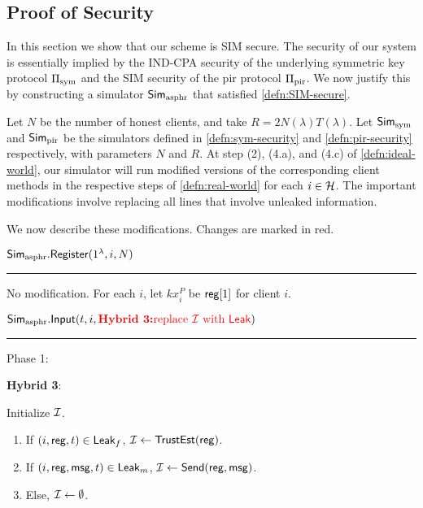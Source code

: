 \subsection{Proof of Security}
In this section we show that our scheme is SIM secure. The security of our system is essentially implied by the IND-CPA security of the underlying symmetric key protocol $\Pi_{\text{sym}}$ and the SIM security of the pir protocol $\Pi_{\text{pir}}$. We now justify this by constructing a simulator $\mathsf{Sim}_{\text{asphr}}$ that satisfied \cref{defn:SIM-secure}.

Let $N$ be the number of honest clients, and take $R = 2N(\lambda)T(\lambda)$. Let $\mathsf{Sim}_{\text{sym}}$ and $\mathsf{Sim}_{\text{pir}}$ be the simulators defined in \cref{defn:sym-security} and \cref{defn:pir-security} respectively, with parameters $N$ and $R$. At step (2), (4.a), and (4.c) of \cref{defn:ideal-world}, our simulator will run modified versions of the corresponding client methods in the respective steps of \cref{defn:real-world} for each $i \in \mathcal{H}$. The important modifications involve replacing all lines that involve unleaked information.

We now describe these modifications. Changes are marked in red.

\vspace{10pt}

$\mathbf{\mathsf{Sim}_{\text{asphr}}.\mathsf{Register}}(1^{\lambda}, i, N)$
\vspace{5pt}
\hrule
\vspace{5pt}
No modification. For each $i$, let $kx^P_i$ be $\mathsf{reg}[1]$ for client $i$.
\vspace{10pt}

$\mathbf{\mathsf{Sim}_{\text{asphr}}.\mathsf{Input}}(t, i, {\color{red} \textbf{Hybrid 3:} \text{replace $\mathcal{I}$ with $\mathsf{Leak}$}})$
\vspace{5pt}
\hrule
\vspace{5pt}
Phase 1: 

{
\color{red} 

\textbf{Hybrid 3}:

Initialize $\mathcal{I}$.

\begin{enumerate}
    \item If $(i, \mathsf{reg}, t) \in \mathsf{Leak}_f$, $\mathcal{I} \leftarrow \mathsf{TrustEst}(\mathsf{reg})$.
    \item If $(i, \mathsf{reg}, \mathsf{msg}, t) \in \mathsf{Leak}_m$, $\mathcal{I} \leftarrow \mathsf{Send}(\mathsf{reg}, \mathsf{msg})$.
    \item Else, $\mathcal{I} \leftarrow \emptyset$.
\end{enumerate}

}

